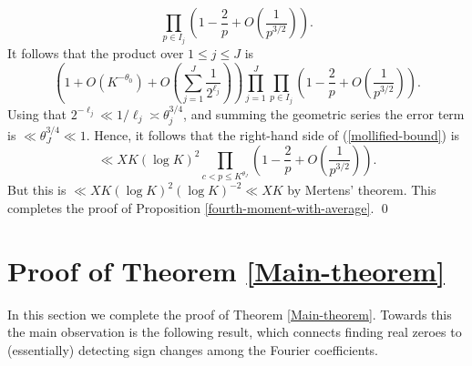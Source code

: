 \documentclass[a4paper,10pt,twoside]{amsart}
\theoremstyle{definition}
\numberwithin{equation}{section}
\renewcommand\:{\colon}
\begin{document}
\[ 
\prod_{p\in I_j}\left(1-\frac2p+O\left(\frac1{p^{3/2}}\right)\right).\]
It follows that the product over $1\leq j\leq J$ is
\[ 
\left(1+O\left(K^{-\theta_0}\right)+O\left(\sum_{j=1}^J\frac1{2^{\ell_j}}\right)\right)\prod_{j=1}^J\prod_{p\in I_j}\left(1-\frac2p+O\left(\frac1{p^{3/2}}\right)\right).
\]
Using that $2^{-\ell_j}\ll 1/\ell_j\asymp\theta_j^{3/4}$, and summing the geometric series the error term is $\ll \theta_J^{3/4}\ll 1$. Hence, it follows that the right-hand side of (\ref{mollified-bound}) is
\[ 
\ll XK(\log K)^2\prod_{c<p\leq K^{\theta_J}}\left(1-\frac2p+O\left(\frac1{p^{3/2}}\right)\right).
\]
\noindent But this is $\ll XK(\log K)^2(\log K)^{-2}\ll XK$ by Mertens' theorem. This completes the proof of Proposition \ref{fourth-moment-with-average}. \qed

\section{Proof of Theorem \ref{Main-theorem}}

\noindent In this section we complete the proof of Theorem \ref{Main-theorem}. Towards this the main observation is the following result, which connects finding real zeroes to (essentially) detecting sign changes among the Fourier coefficients. 
\end{document}

